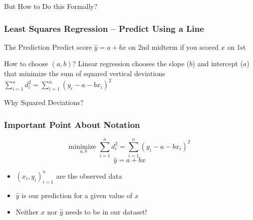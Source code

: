 \documentclass[handout]{beamer}
\begin{document}

\begin{frame}

\centering \Huge But How to Do this Formally?


\end{frame}
\begin{frame}
\frametitle{Least Squares Regression -- Predict Using a Line}

\begin{block}{The Prediction}
Predict score $\hat{y} = a + b x$ on 2nd midterm if you scored $x$ on 1st
\end{block}

\begin{block}{How to choose $(a,b)$?}
  Linear regression chooses the slope ($b$) and intercept ($a$) that \alert{minimize the sum of squared vertical deviations}
$\displaystyle\sum_{i = 1}^n d_i^2 = \sum_{i=1}^n (y_i - a - b x_i)^2$
\end{block}

\begin{block}{Why Squared Deviations?}
\end{block}
\end{frame}
\begin{frame}
	\frametitle{Important Point About Notation}
  $$\boxed{\underset{a,b}{\mbox{minimize }}\sum_{i = 1}^n d_i^2 = \sum_{i=1}^n (y_i - a - b x_i)^2}$$
			$$\boxed{\hat{y} = a + bx}$$
		\begin{itemize}
		\item $(x_i, y_i)_{i=1}^n$ are the \alert{observed data}
		\item $\widehat{y}$ is our \alert{prediction} for a given value of $x$
		\item Neither $x$ nor $\widehat{y}$ needs to be in our dataset!
	\end{itemize}
\end{frame}
\end{document}
